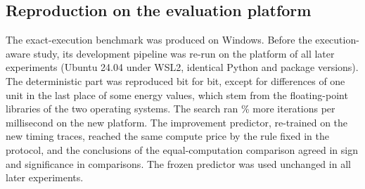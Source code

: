 \subsection{Reproduction on the evaluation platform}\label{sec:repro}
The exact-execution benchmark was produced on Windows. Before the execution-aware study, its development pipeline was
re-run on the platform of all later experiments (Ubuntu 24.04 under WSL2, identical Python and package versions). The
deterministic part was reproduced bit for bit, except for differences of one unit in the last place of some energy
values, which stem from the floating-point libraries of the two operating systems. The search ran
\% more iterations per millisecond on the new platform. The improvement predictor, re-trained on the
new timing traces, reached the same compute price by the rule fixed in the protocol, and the conclusions of the
equal-computation comparison agreed in sign and significance in  comparisons. The frozen predictor
was used unchanged in all later experiments.

